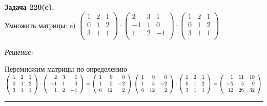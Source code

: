 \documentclass[a4paper, 12pt]{article}
\newenvironment{problem}[2][Задача]
    { \begin{mdframed}[backgroundcolor=gray!10] \textbf{#1 #2.} \\}
    {  \end{mdframed}}
\newenvironment{solution}
    {\textit{Решение: }}
    {\noindent\rule{7in}{1.5pt}}
\begin{document}
\begin{problem}{220(e)}
Умножить матрицы:
e)
$\left(
\begin{array}{rrr}
1 & 2 & 1 \\
0 & 1 & 2 \\
3 & 1 & 1 \\
\end{array}
\right)
\cdot
\left(
\begin{array}{rrr}
2 & 3 & 1 \\
-1 & 1 & 0 \\
1 & 2 & -1 \\
\end{array}
\right)
\cdot
\left(
\begin{array}{rrr}
1 & 2 & 1 \\
0 & 1 & 2 \\
3 & 1 & 1 \\
\end{array}
\right)
$

\end{problem}
\begin{solution}

Перемножим матрицы по определению \\
$\left(
\begin{array}{rrr}
1 & 2 & 1 \\
0 & 1 & 2 \\
3 & 1 & 1 \\
\end{array}
\right)
\cdot
\left(
\begin{array}{rrr}
2 & 3 & 1 \\
-1 & 1 & 0 \\
1 & 2 & -1 \\
\end{array}
\right)
=
\left(
\begin{array}{rrr}
1 & 9 & 0 \\
1 & 5 & -2 \\
6 & 12 & 2 \\
\end{array}
\right) \\
\left(
\begin{array}{rrr}
1 & 9 & 0 \\
1 & 5 & -2 \\
6 & 12 & 2 \\
\end{array}
\right)
\cdot
\left(
\begin{array}{rrr}
1 & 2 & 1 \\
0 & 1 & 2 \\
3 & 1 & 1 \\
\end{array}
\right)
=
\left(
\begin{array}{rrr}
1 & 11 & 19 \\
-5 & 5 & 9 \\
12 & 26 & 32 \\
\end{array}
\right)
$

\end{solution}
\end{document}

